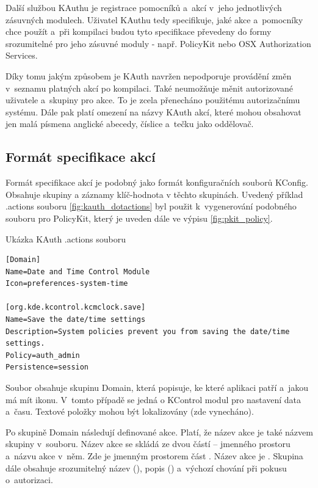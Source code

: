 Další službou KAuthu je registrace pomocníků a~akcí v~jeho jednotlivých zásuvných modulech. Uživatel KAuthu tedy specifikuje, jaké akce a~pomocníky chce použít a~při kompilaci budou tyto specifikace převedeny do formy srozumitelné pro jeho zásuvné moduly - např. PolicyKit nebo OSX Authorization Services.

Díky tomu jakým způsobem je KAuth navržen nepodporuje provádění změn v~seznamu platných akcí po kompilaci. Také neumožňuje měnit autorizované uživatele a~skupiny pro akce. To je zcela přenecháno použitému autorizačnímu systému. Dále pak platí omezení na názvy KAuth akcí, které mohou obsahovat jen malá písmena anglické abecedy, číslice a~tečku jako oddělovač.

\subsection*{Formát specifikace akcí}
Formát specifikace akcí je podobný jako formát konfiguračních souborů KConfig. Obsahuje skupiny a záznamy klíč-hodnota v těchto skupinách. Uvedený příklad .actions souboru \ref{fig:kauth_dotactions} byl použit k~vygenerování podobného souboru pro PolicyKit, který je uveden dále ve výpisu \ref{fig:pkit_policy}.

\begin{mylisting}
\caption{Ukázka KAuth .actions souboru}
\label{fig:kauth_dotactions}
\begin{lstlisting}
[Domain]
Name=Date and Time Control Module
Icon=preferences-system-time

[org.kde.kcontrol.kcmclock.save]
Name=Save the date/time settings
Description=System policies prevent you from saving the date/time settings.
Policy=auth_admin
Persistence=session
\end{lstlisting}
\end{mylisting}

Soubor obsahuje skupinu Domain, která popisuje, ke které aplikaci patří a~jakou má mít ikonu. V~tomto případě se jedná o KControl modul pro nastavení data a~času. Textové položky mohou být lokalizovány (zde vynecháno).

Po skupině Domain následují definované akce. Platí, že název akce je také názvem skupiny v~souboru. Název akce se skládá ze dvou částí -- jmenného prostoru a~názvu akce v~něm. Zde je jmenným prostorem část . Název akce je . Skupina dále obsahuje srozumitelný název (), popis () a~výchozí chování při pokusu o~autorizaci.


